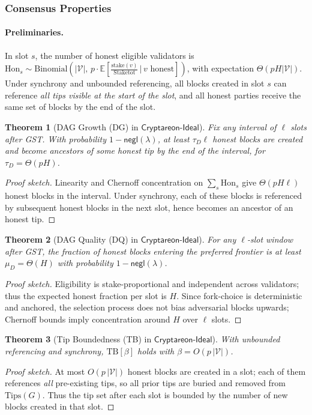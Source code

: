 \documentclass[11pt]{article}
\newtheorem{theorem}{Theorem}[section]
\newcommand{\ProjIdeal}{\ensuremath{\mathsf{Cryptareon\text{-}Ideal}}\xspace}
\newcommand{\negl}{\ensuremath{\mathsf{negl}}\xspace}
\newcommand{\Val}{\ensuremath{\mathcal{V}}\xspace}
\newcommand{\stake}{\ensuremath{\mathrm{stake}}\xspace}
\newcommand{\StakeTot}{\ensuremath{\mathrm{Stake}{\mathrm{tot}}}\xspace}
\newcommand{\stakefrac}[1]{\ensuremath{\frac{\stake(#1)}{\StakeTot}}\xspace}
\newcommand{\Tips}{\ensuremath{\mathrm{Tips}}\xspace}
\begin{document}
\subsubsection{Consensus Properties}

\paragraph{Preliminaries.} In slot $s$, the number of honest eligible validators is $\mathrm{Hon}_s\sim \mathrm{Binomial}(|\Val|,\,p\cdot \mathbb{E}[\stakefrac{v}\,|\,v\text{ honest}])$, with expectation $\Theta(pH|\Val|)$. Under synchrony and unbounded referencing, all blocks created in slot $s$ can reference \emph{all tips visible at the start of the slot}, and all honest parties receive the same set of blocks by the end of the slot.

\begin{theorem}[DAG Growth (DG) in \ProjIdeal]
\label{thm:ideal-DG}
Fix any interval of $\ell$ slots after GST. With probability $1-\negl(\lambda)$, at least $\tau_D\ell$ honest blocks are created and become ancestors of some honest tip by the end of the interval, for $\tau_D=\Theta(pH)$.
\end{theorem}
\begin{proof}[Proof sketch]
Linearity and Chernoff concentration on $\sum_{s} \mathrm{Hon}_s$ give $\Theta(pH\ell)$ honest blocks in the interval. Under synchrony, each of these blocks is referenced by subsequent honest blocks in the next slot, hence becomes an ancestor of an honest tip. 
\end{proof}

\begin{theorem}[DAG Quality (DQ) in \ProjIdeal]
\label{thm:ideal-DQ}
For any $\ell$-slot window after GST, the fraction of honest blocks entering the preferred frontier is at least $\mu_D=\Theta(H)$ with probability $1-\negl(\lambda)$.
\end{theorem}
\begin{proof}[Proof sketch]
Eligibility is stake-proportional and independent across validators; thus the expected honest fraction per slot is $H$. Since fork-choice is deterministic and anchored, the selection process does not bias adversarial blocks upwards; Chernoff bounds imply concentration around $H$ over $\ell$ slots.
\end{proof}

\begin{theorem}[Tip Boundedness (TB) in \ProjIdeal]
\label{thm:ideal-TB}
With unbounded referencing and synchrony, $\mathrm{TB}[\beta]$ holds with $\beta=O(p\,|\Val|)$.
\end{theorem}
\begin{proof}[Proof sketch]
At most $O(p\,|\Val|)$ honest blocks are created in a slot; each of them references \emph{all} pre-existing tips, so all prior tips are buried and removed from $\Tips(G)$. Thus the tip set after each slot is bounded by the number of new blocks created in that slot.
\end{proof}
\end{document}
